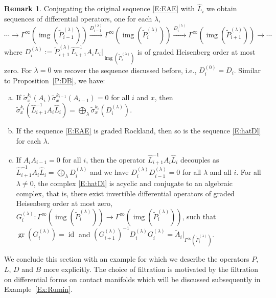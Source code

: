 \documentclass[reqno,12pt]{amsart}
\DeclareMathOperator{\img}{img}
\DeclareMathOperator{\gr}{gr}
\DeclareMathOperator{\id}{id}
\theoremstyle{plain}
\theoremstyle{definition}
\newtheorem{remark}[theorem]{Remark}
\begin{document}
\begin{remark}
Conjugating the original sequence \eqref{E:EAE} with $\hat L_i$ we obtain sequences of differential operators, one for each $\lambda$,
\begin{equation}\label{E:hatDl}
\cdots\to\Gamma^\infty(\img(\tilde P^{(\lambda)}_{i-1}))\xrightarrow{D^{(\lambda)}_{i-1}}\Gamma^\infty(\img(\tilde P^{(\lambda)}_{i}))\xrightarrow{D^{(\lambda)}_{i}}\Gamma^\infty(\img(\tilde P^{(\lambda)}_{i+1}))\to\cdots
\end{equation}
where $D^{(\lambda)}_i:=\tilde P^{(\lambda)}_{i+1}\hat L^{-1}_{i+1}A_i\hat L_i|_{\img(\tilde P^{(\lambda)}_i)}$ is of graded Heisenberg order at most zero.
For $\lambda=0$ we recover the sequence discussed before, i.e., $D^{(0)}_i=D_i$.
Similar to Proposition~\ref{P:DB}, we have:
\begin{enumerate}[(a)]
\item 
If $\tilde\sigma^{k_i}_x(A_i)\tilde\sigma^{k_{i-1}}_x(A_{i-1})=0$ for all $i$ and $x$, then $\tilde\sigma^{k_i}_x(\hat L^{-1}_{i+1}A_i\hat L_i)=\bigoplus_\lambda\tilde\sigma^{k_i}_x(D_i^{(\lambda)})$.

\item 
If the sequence \eqref{E:EAE} is graded Rockland, then so is the sequence \eqref{E:hatDl} for each $\lambda$.

\item 
If $A_iA_{i-1}=0$ for all $i$, then the operator $\hat L_{i+1}^{-1}A_i\hat L_i$ decouples as $\hat L_{i+1}^{-1}A_i\hat L_i=\bigoplus_\lambda D^{(\lambda)}_i$ and we have $D_i^{(\lambda)}D^{(\lambda)}_{i-1}=0$ for all $\lambda$ and all $i$.
For all $\lambda\neq0$, the complex \eqref{E:hatDl} is acyclic and conjugate to an algebraic complex, that is, there exist invertible differential operators of graded Heisenberg order at most zero, $G_i^{(\lambda)}\colon\Gamma^\infty(\img(\tilde P^{(\lambda)}_i))\to\Gamma^\infty(\img(\tilde P_i^{(\lambda)}))$, such that $\gr(G_i^{(\lambda)})=\id$ and $(G_{i+1}^{(\lambda)})^{-1}D_i^{(\lambda)}G_i^{(\lambda)}=\tilde A_i|_{\Gamma^\infty(\tilde P_i^{(\lambda)})}$.
\end{enumerate}
\end{remark}


We conclude this section with an example for which we describe the operators $P$, $L$, $D$ and $B$ more explicitly.
The choice of filtration is motivated by the filtration on differential forms on contact manifolds which will be discussed subsequently in Example~\ref{Ex:Rumin}.
\end{document}
